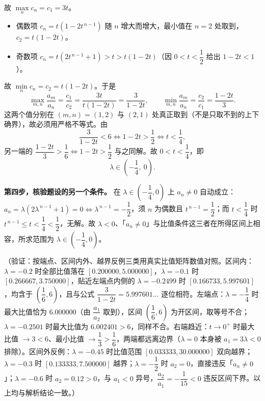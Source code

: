 \begin{answer}
故 \(\max\limits_{n}c_{n}=c_{1}=3t\)。

\begin{itemize}
\item 偶数项 \(c_{n}=t\left(1-2t^{\,n-1}\right)\) 随 \(n\) 增大而增大，最小值在 \(n=2\) 处取到，\(c_{2}=t(1-2t)\)。
\item 奇数项 \(c_{n}=t\left(2t^{\,n-1}+1\right)>t>t(1-2t)\)（因 \(0<t<\dfrac{1}{2}\) 给出 \(1-2t<1\)）。
\end{itemize}

故 \(\min\limits_{n}c_{n}=c_{2}=t(1-2t)\)。于是
\nopagebreak[4]
\[
\max_{m,n}\frac{a_{m}}{a_{n}}=\frac{c_{1}}{c_{2}}=\frac{3t}{t(1-2t)}=\frac{3}{1-2t},\qquad\min_{m,n}\frac{a_{m}}{a_{n}}=\frac{c_{2}}{c_{1}}=\frac{1-2t}{3}.
\]
这两个值分别在 \((m,n)=(1,2)\) 与 \((2,1)\) 处真正取到（不是只取不到的上下确界），故必须用严格不等式。由
\nopagebreak[4]
\[
\frac{3}{1-2t}<6\iff1-2t>\frac{1}{2}\iff t<\frac{1}{4},
\]
另一端的 \(\dfrac{1-2t}{3}>\dfrac{1}{6}\iff1-2t>\dfrac{1}{2}\) 与之同解。故 \(0<t<\dfrac{1}{4}\)，即
\nopagebreak[4]
\[
\lambda\in\left(-\frac{1}{4},\ 0\right).
\]

\textbf{第四步，核验题设的另一个条件。} 在 \(\lambda\in\left(-\dfrac{1}{4},0\right)\) 上 \(a_{n}\neq0\) 自动成立：\(a_{n}=\lambda\left(2\lambda^{\,n-1}+1\right)=0\iff\lambda^{\,n-1}=-\dfrac{1}{2}\)，须 \(n\) 为偶数且 \(t^{\,n-1}=\dfrac{1}{2}\)；而 \(t<\dfrac{1}{4}\) 时 \(t^{\,n-1}\leqslant t<\dfrac{1}{4}<\dfrac{1}{2}\)，无解。故 \(\lambda<0\)、「\(a_{n}\neq0\)」与比值条件这三者在所得区间上相容，所求范围为 \(\lambda\in\left(-\dfrac{1}{4},0\right)\)。

（验证：按端点、区间内外、越界反例三类用真实比值矩阵数值对照。区间内：\(\lambda=-0.2\) 时全部比值落在 \([0.200000,5.000000]\)，\(\lambda=-0.1\) 时 \([0.266667,3.750000]\)，贴近左端点内侧的 \(\lambda=-0.2499\) 时 \([0.166733,5.997601]\)，均含于 \(\left(\dfrac{1}{6},6\right)\)，且与公式 \(\dfrac{3}{1-2t}=5.997601\ldots\) 逐位相符。左端点：\(\lambda=-\dfrac{1}{4}\) 时最大比值恰为 \(6.000000\)（由 \(\dfrac{a_{1}}{a_{2}}\) 取到），区间 \(\left(\dfrac{1}{6},6\right)\) 为开区间，取等号不合；\(\lambda=-0.2501\) 时最大比值为 \(6.002401>6\)，同样不合。右端趋近：\(t\to0^{+}\) 时最大比值 \(\to3<6\)、最小比值 \(\to\dfrac{1}{3}>\dfrac{1}{6}\)，两端都远离边界（\(\lambda=0\) 本身被 \(a_{1}=3\lambda<0\) 排除）。区间外反例：\(\lambda=-0.45\) 时比值范围 \([0.033333,30.000000]\) 双向越界；\(\lambda=-0.3\) 时 \([0.133333,7.500000]\) 越界；\(\lambda=-\dfrac{1}{2}\) 时 \(a_{2}=0\)，直接违反「\(a_{n}\neq0\)」；\(\lambda=-0.6\) 时 \(a_{2}=0.12>0\)，与 \(a_{1}<0\) 异号，\(\dfrac{a_{2}}{a_{1}}=-\dfrac{1}{15}<0\) 违反区间下界。以上均与解析结论一致。）




\end{answer}